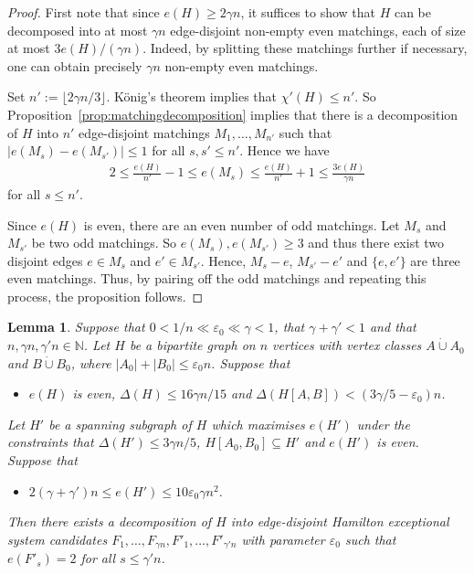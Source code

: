 \documentclass{memo-l}
\newtheorem{lemma}[firstthm]{Lemma}
\def\COMMENT#1{}
\def\eps{\varepsilon}
\def\epszero{\eps_0}
\numberwithin{section}{chapter}
\numberwithin{equation}{section}
\numberwithin{firstthm}{section}
\numberwithin{figure}{section}
\begin{document}
{\begin{proof}
First note that since $e(H) \ge 2\gamma n $, it suffices to show that $H$ can be decomposed into at most $\gamma n $ edge-disjoint non-empty even matchings,
each of size at most $3e(H)/(\gamma n)$. Indeed, by splitting these matchings further if necessary, one can obtain precisely $\gamma n $
non-empty even matchings.

Set $n' := \lfloor 2\gamma n/3 \rfloor$.
K\"onig's theorem implies that $\chi '(H) \le n'$. So Proposition~\ref{prop:matchingdecomposition} implies that there
is a decomposition of $H$ into $n'$ edge-disjoint
matchings $M_1, \dots ,M_{n'}$ such that $|e(M_s) - e(M_{s'})| \le 1$ for all $s,s' \le n'$.
Hence we have 
\begin{align*}
2 \le \frac{e(H)}{n'} -1 \le e(M_s) \le \frac{e(H)}{n'}+1 \le \frac{3e(H)}{\gamma n}
\end{align*}
for all $s \le n'$.%
   \COMMENT{The final inequality holds since $ \frac{e(H)}{n'}+1\le  \frac{e(H)}{\gamma n/2}+1\le \frac{3e(H)}{\gamma n}$ since $\frac{e(H)}{\gamma n}\ge 2$.}
Since $e(H)$ is even, there are an even number of odd matchings.
Let $M_s$ and $M_{s'}$ be two odd matchings.
So $e(M_s),e(M_{s'}) \ge 3$ and thus there exist two disjoint edges $e \in M_s$ and $e' \in M_{s'}$.
Hence, $M_s - e$, $M_{s'} - e'$ and $\{e, e'\}$ are three even matchings.
Thus, by pairing off the odd matchings and repeating this process,  the proposition follows.
\end{proof}



\begin{lemma} \label{lma:BESdecomprelim}
Suppose that $0 < 1/n \ll \eps_0 \ll \gamma  < 1$, that $ \gamma + \gamma' < 1$ and that $n, \gamma n, \gamma' n \in \mathbb N$.
Let $H$ be a bipartite graph on $n$ vertices with vertex classes $A \dot\cup A_0$ and $ B  \dot\cup B_0$, where $|A_0|+|B_0| \le \eps_0 n$.
Suppose that
\begin{itemize}
	\item[{\rm (i)}] $e(H)$ is even, $\Delta(H) \le 16 \gamma n /15$ and $\Delta(H[A,B]) < (3 \gamma /5 - \epszero) n$. 
\end{itemize}
Let $H'$ be a spanning subgraph of $H$ which maximises $e(H')$ under the constraints  that $\Delta(H') \le 3 \gamma n /5$, $H[A_0,B_0] \subseteq H'$
and $e(H')$ is even. Suppose that
\begin{itemize}
\item[{\rm (ii)}] 
$2( \gamma +  \gamma' )n \le e(H') \le 10 \epszero  \gamma n^2$.	
\end{itemize}
Then there exists a decomposition of $H$ into edge-disjoint Hamilton exceptional system candidates $F_1, \dots ,F_{\gamma n},F'_1, \dots ,F'_{\gamma' n}$
with parameter $\eps_0$ such that $e(F'_s) = 2$ for all $s \le \gamma' n$.
\end{lemma}

}
\end{document}
